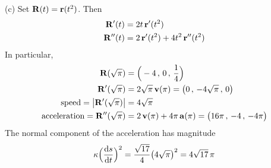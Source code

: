 \begin{solution}
	(c) Set $\mathbf{R}(t) = \mathbf{r}(t^2)$. Then 
	\begin{align*}
	\mathbf{R}'(t)&=2t\,\mathbf{r}'(t^2)  \\
	\mathbf{R}''(t) &= 2\,\mathbf{r}'(t^2) +4t^2\,\mathbf{r}''(t^2) 
	\end{align*}
	In particular,
	\begin{align*}
	\mathbf{R}(\sqrt{\pi}) &= \Big(-4\,,\, 0\,,\,  \frac{1}{4}\Big) \\
	\mathbf{R}'(\sqrt{\pi}) &= 2\sqrt{\pi}\,\mathbf{v}(\pi)
	=\big(0\,,\, -4\sqrt{\pi}\,,\, 0\big) \\
	\text{speed} = \big|\mathbf{R}'(\sqrt{\pi})\big| &=4\sqrt{\pi} \\
	\text{acceleration}=\mathbf{R}''(\sqrt{\pi})
	&= 2\,\mathbf{v}(\pi)+4\pi\,\mathbf{a}(\pi)
	= \big( 16\pi\,,\, -4\,,\, -4\pi\big) 
	\end{align*}
	The normal component of the acceleration has magnitude
	\begin{align*}
	\ka\Big(\diff{s}{t}\Big)^2 = \frac{\sqrt{17}}{4}\big(4\sqrt{\pi}\big)^2
	=4\sqrt{17}\,\pi
	\end{align*}
\end{solution}
